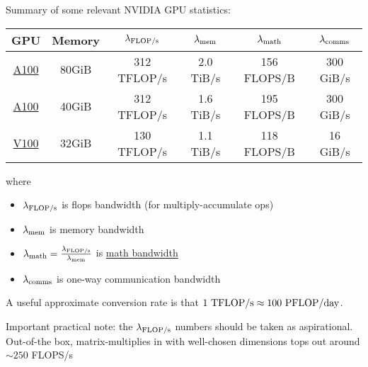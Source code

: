Summary of some relevant NVIDIA GPU statistics:
\begin{center}
	\begin{tabular}{| c |c| c |c |c| c| }\hline
		GPU                                                                                                                                  & Memory & $ \lambda _{ {\rm FLOP/s }  } $ & $ \lambda _{ {\rm mem}  } $ & $ \lambda _{ {\rm math}  } $ & $ \lambda _{ {\rm comms}  } $ \\ \hline
		\href{https://www.nvidia.com/content/dam/en-zz/Solutions/Data-Center/a100/pdf/nvidia-a100-datasheet-nvidia-us-2188504-web.pdf}{A100} & 80GiB  & 312  TFLOP/s                    & 2.0 TiB/s                   & 156 FLOPS/B                  & 300 GiB/s                     \\ \hline
		\href{https://www.nvidia.com/content/dam/en-zz/Solutions/Data-Center/a100/pdf/nvidia-a100-datasheet.pdf}{A100}                       & 40GiB  & 312  TFLOP/s                    & 1.6 TiB/s                   & 195 FLOPS/B                  & 300 GiB/s                     \\ \hline
		\href{https://images.nvidia.com/content/technologies/volta/pdf/volta-v100-datasheet-update-us-1165301-r5.pdf}{V100}                  & 32GiB  & 130  TFLOP/s                    & 1.1 TiB/s                   & 118  FLOPS/B                 & 16 GiB/s                      \\ \hline
	\end{tabular}
\end{center}
where
\begin{itemize}
	\item $ \lambda _{ {\rm  FLOP/s}  } $ is flops bandwidth (for   multiply-accumulate ops)
	\item $ \lambda _{ {\rm  mem}  } $ is memory bandwidth
	\item $ \lambda _{ {\rm  math}  } = \frac{  \lambda _{ {\rm FLOP/s}  } }{ \lambda _{ {\rm mem} } } $ is \href{https://docs.nvidia.com/deeplearning/performance/dl-performance-gpu-background/index.html#gpu-arch}{math bandwidth}
	\item $ \lambda _{ {\rm  comms}  } $ is one-way communication bandwidth
\end{itemize}
A useful approximate conversion rate is that $ 1 \ {\rm TFLOP/s} \approx 100\  {\rm PFLOP/day} $.

Important practical note: the $ \lambda _{ {\rm FLOP/s} } $ numbers should be taken as aspirational.
Out-of-the box,  matrix-multiplies in  with well-chosen
dimensions tops out around $ \sim 250 $ FLOPS/s




